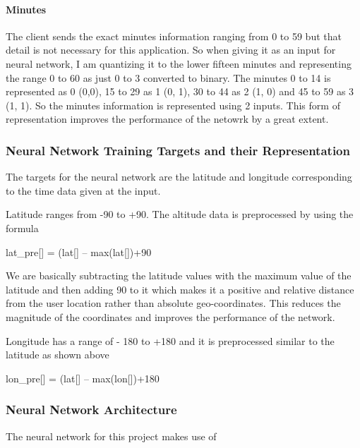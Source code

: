 \documentclass[conference]{IEEEtran}
\begin{document}
\paragraph{Minutes}
The client sends the exact minutes information ranging from 0 to 59 but that detail is not necessary for this application. So when giving it as an input for neural network, I am quantizing it to the lower fifteen minutes and representing the range 0 to 60 as just 0 to 3 converted to binary. The minutes 0 to 14 is represented as 0 (0,0), 15 to 29 as 1 (0, 1), 30 to 44 as 2 (1, 0) and 45 to 59 as 3 (1, 1). So the minutes information is represented using 2 inputs. This form of representation improves the performance of the netowrk by a great extent.

\subsubsection{Neural Network Training Targets and their Representation}
The targets for the neural network are the latitude and longitude corresponding to the time data given at the input.

Latitude ranges from -90 to +90. The altitude data is preprocessed by using the formula 

lat\_pre[] = (lat[] – max(lat[])+90

We are basically subtracting the latitude values with the maximum value of the latitude and then adding 90 to it which makes it a positive and relative distance from the user location rather than absolute geo-coordinates. This reduces the magnitude of the coordinates and improves the performance of the network.

Longitude has a range of - 180 to +180 and it is preprocessed similar to the latitude as shown above 

lon\_pre[] = (lat[] – max(lon[])+180

\subsubsection{Neural Network Architecture}
The neural network for this project makes use of 


\end{document}
